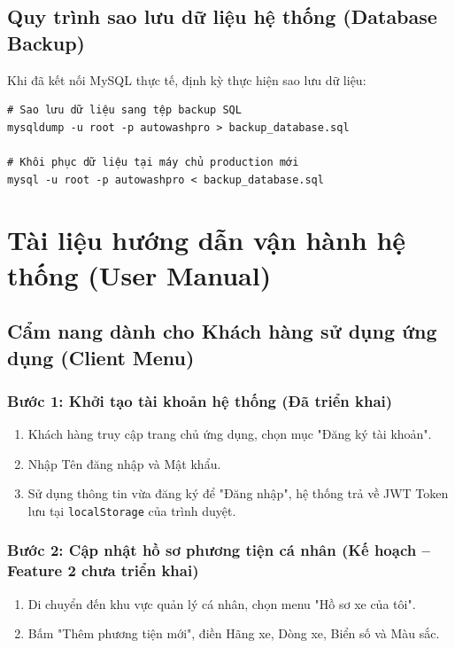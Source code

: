 \subsection{Quy trình sao lưu dữ liệu hệ thống (Database Backup)}
Khi đã kết nối MySQL thực tế, định kỳ thực hiện sao lưu dữ liệu:
\begin{verbatim}
# Sao lưu dữ liệu sang tệp backup SQL
mysqldump -u root -p autowashpro > backup_database.sql

# Khôi phục dữ liệu tại máy chủ production mới
mysql -u root -p autowashpro < backup_database.sql
\end{verbatim}

\section{Tài liệu hướng dẫn vận hành hệ thống (User Manual)}

\subsection{Cẩm nang dành cho Khách hàng sử dụng ứng dụng (Client Menu)}

\subsubsection{Bước 1: Khởi tạo tài khoản hệ thống (Đã triển khai)}
\begin{enumerate}
    \item Khách hàng truy cập trang chủ ứng dụng, chọn mục "Đăng ký tài khoản".
    \item Nhập Tên đăng nhập và Mật khẩu.
    \item Sử dụng thông tin vừa đăng ký để "Đăng nhập", hệ thống trả về JWT Token lưu tại \texttt{localStorage} của trình duyệt.
\end{enumerate}

\subsubsection{Bước 2: Cập nhật hồ sơ phương tiện cá nhân (Kế hoạch -- Feature 2 chưa triển khai)}
\begin{enumerate}
    \item Di chuyển đến khu vực quản lý cá nhân, chọn menu "Hồ sơ xe của tôi".
    \item Bấm "Thêm phương tiện mới", điền Hãng xe, Dòng xe, Biển số và Màu sắc.
\end{enumerate}

